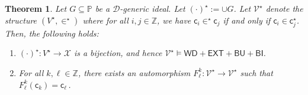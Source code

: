\documentclass[10pt,a4paper, openany,  oldfontcommands]{memoir}
\newtheorem{theorem}{Theorem}
\newtheorem{open problem} [theorem] {Open Problem}
\begin{document}
\begin{theorem}
Let  $ G \subseteq \mathbb{P} $ be  a  $  \mathcal{D} $-generic ideal.  
 Let  $ ( \cdot )^{  \star }    :=   \cup  G  $. 
  Let  $    \mathcal{V}^{ \star }  $ denote the structure  $  \left(  V^{  \star }   ,  \in^{  \star }     \right)   $
  where  for all  $  i, j  \in  \mathbb{Z} $,   we have   $   \mathsf{c}_i   \in^{  \star }   \mathsf{c}_j  $ if and only if  $  \mathsf{c}_i    \in   \mathsf{c}_j^{  \star }  $. 
Then, the following holds: 
\begin{enumerate}
\item  $  (  \cdot )^{  \star }   :  V^{  \star }     \to        \mathcal{X}   $  is a bijection, and hence  
$ \mathcal{V}^{ \star }    \models      \mathsf{WD} +   \mathsf{EXT} +  \mathsf{BU}    +  \mathsf{BI} $. 

\item  For all  $   k, \ell  \in  \mathbb{Z} $,   there exists an automorphism  
$  F^k_{  \ell  }   :    \mathcal{V}^{  \star }    \to      \mathcal{V}^{  \star }    $  such that   
$  F^k_{  \ell  }    \left(   \mathsf{c}_k  \right)   =    \mathsf{c}_{  \ell   }       \,      $. 
  \end{enumerate}
\end{theorem}
\end{document}
